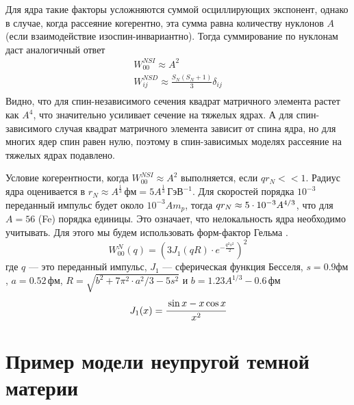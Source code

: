 Для ядра такие факторы усложняются суммой осциллирующих экспонент, однако в случае, когда рассеяние когерентно, эта сумма равна количеству нуклонов $A$ (если взаимодействие изоспин-инвариантно). Тогда суммирование по нуклонам даст аналогичный ответ
\begin{equation}
	\begin{split}
		W^{N SI}_{00} \approx A^2 \\ 
		W^{N SD}_{ij} \approx \frac{S_{N}(S_{N}+1)}{3} \delta_{ij} \\
	\end{split}
\end{equation}
Видно, что для спин-независимого сечения квадрат матричного элемента растет как $A^4$, что значительно усиливает сечение на тяжелых ядрах. А для спин-зависимого случая квадрат матричного элемента зависит от спина ядра, но для многих ядер спин равен нулю, поэтому в спин-зависимых моделях рассеяние на тяжелых ядрах подавлено.

Условие когерентности, когда $W^{N SI}_{00} \approx A^2$ выполняется, если $q r_N << 1$. Радиус ядра оценивается в $r_N \approx A^{\frac{1}{3}} \,\text{фм} = 5 A^{\frac{1}{3}} \,\text{ГэВ}^{-1}$. Для скоростей порядка $10^{-3}$ переданный импульс будет около $10^{-3}A m_p$, тогда $qr_N \approx {5}\cdot 10^{-3}A^{4/3}$, что для $A=56$ (Fe) порядка единицы. Это означает, что нелокальность ядра необходимо учитывать. Для этого мы будем использовать форм-фактор Гельма \cite{D_da_2007}.
\begin{equation}
	\label{eq:form_factor}
	W^N_{00}(q) = \left(3J_1(qR)\cdot e^{-\frac{q^2s^2}{2}}\right)^2
\end{equation}
где $q$ --- это переданный импульс, $J_1$ --- сферическая функция Бесселя, $s = 0.9 \text{фм}$, $a = 0.52 \,\text{фм}$, $R = \sqrt{b^2+7\pi^2\cdot a^2/3-5s^2}$ и $b = 1.23 A^{1/3} - 0.6 \,\text{фм}$
\begin{equation}
	J_1(x) = \cfrac{\sin{x}-x \cos{x}}{x^2} 
\end{equation}


\section{Пример модели неупругой темной материи}

